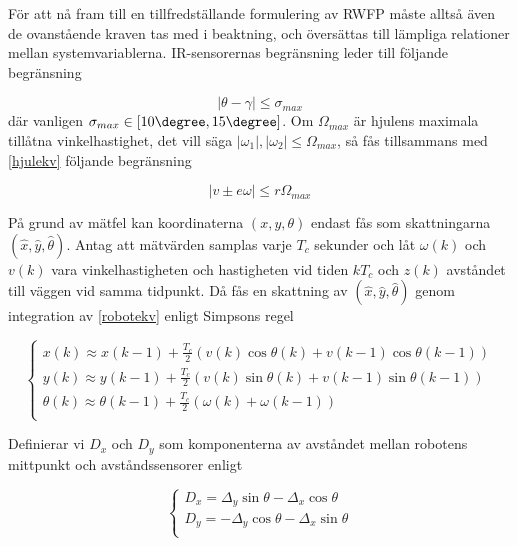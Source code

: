 \documentclass[11pt]{article}
\begin{document}
\begin{flushleft}
För att nå fram till en tillfredställande formulering av RWFP måste alltså även de ovanstående kraven tas med i beaktning, och översättas till lämpliga relationer mellan systemvariablerna. IR-sensorernas begränsning leder till följande begränsning

\begin{equation}\label{IRkrav}
	|\theta - \gamma| \leq \sigma_{max}
\end{equation}
där vanligen \(\sigma_{max} \in [10\degree,15\degree]\). Om $\Omega_{max}$ är hjulens maximala tillåtna vinkelhastighet, det vill säga \(|\omega_1|,|\omega_2| \leq \Omega_{max}\), så fås tillsammans med \eqref{hjulekv} följande begränsning

\begin{equation}\label{hastbegr}
	|v \pm e\omega| \leq r\Omega_{max}
\end{equation}

På grund av mätfel kan koordinaterna \((x,y,\theta)\) endast fås som skattningarna \((\hat{x},\hat{y},\hat{\theta})\). Antag att mätvärden samplas varje $T_c$ sekunder och låt $\omega(k)$ och $v(k)$ vara vinkelhastigheten och hastigheten vid tiden $kT_c$ och $z(k)$ avståndet till väggen vid samma tidpunkt. Då fås en skattning av $(\hat{x},\hat{y},\hat{\theta})$ genom integration av \eqref{robotekv} enligt Simpsons regel

\begin{equation}\label{rwfpåterkoppling}
	\begin{cases}
	x(k) \approx x(k-1) + \frac{T_c}{2} (v(k) \cos \theta(k) + v(k-1)\cos \theta(k-1)) \\
	y(k) \approx y(k-1) + \frac{T_c}{2} (v(k) \sin \theta(k) + v(k-1)\sin \theta(k-1)) \\
	\theta(k) \approx \theta(k-1) + \frac{T_c}{2} (\omega(k) + \omega(k-1)) \\
	\end{cases}
\end{equation}

Definierar vi $D_x$ och $D_y$ som komponenterna av avståndet mellan robotens mittpunkt och avståndssensorer enligt

\begin{equation*}
	\begin{cases}
	D_x = \Delta_y \sin \theta - \Delta_x \cos \theta \\
	D_y = -\Delta_y \cos \theta - \Delta_x \sin \theta \\
	\end{cases}
\end{equation*}


\end{flushleft}
\end{document}
